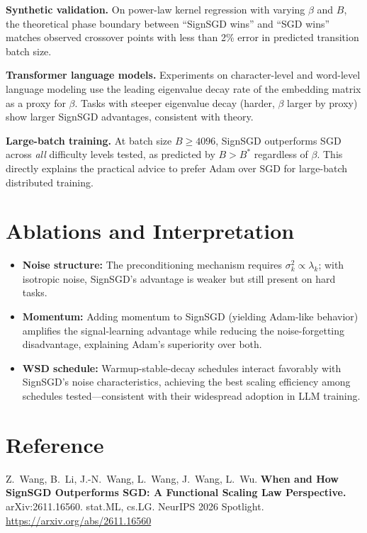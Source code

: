 \documentclass[10pt,twocolumn]{article}
\begin{document}
\textbf{Synthetic validation.}
On power-law kernel regression with varying $\beta$ and $B$, the theoretical phase boundary between ``SignSGD wins'' and ``SGD wins'' matches observed crossover points with less than 2\% error in predicted transition batch size.

\textbf{Transformer language models.}
Experiments on character-level and word-level language modeling use the leading eigenvalue decay rate of the embedding matrix as a proxy for $\beta$.
Tasks with steeper eigenvalue decay (harder, $\beta$ larger by proxy) show larger SignSGD advantages, consistent with theory.

\textbf{Large-batch training.}
At batch size $B \geq 4096$, SignSGD outperforms SGD across \emph{all} difficulty levels tested, as predicted by $B > B^*$ regardless of $\beta$.
This directly explains the practical advice to prefer Adam over SGD for large-batch distributed training.

\section{Ablations and Interpretation}

\begin{itemize}[leftmargin=1em,itemsep=2pt]
  \item \textbf{Noise structure:} The preconditioning mechanism requires $\sigma^2_k \propto \lambda_k$; with isotropic noise, SignSGD's advantage is weaker but still present on hard tasks.
  \item \textbf{Momentum:} Adding momentum to SignSGD (yielding Adam-like behavior) amplifies the signal-learning advantage while reducing the noise-forgetting disadvantage, explaining Adam's superiority over both.
  \item \textbf{WSD schedule:} Warmup-stable-decay schedules interact favorably with SignSGD's noise characteristics, achieving the best scaling efficiency among schedules tested---consistent with their widespread adoption in LLM training.
\end{itemize}

\section*{Reference}
Z.\ Wang, B.\ Li, J.-N.\ Wang, L.\ Wang, J.\ Wang, L.\ Wu.
\textbf{When and How SignSGD Outperforms SGD: A Functional Scaling Law Perspective.}
arXiv:2611.16560. stat.ML, cs.LG. NeurIPS 2026 Spotlight.
\url{https://arxiv.org/abs/2611.16560}
\end{document}
